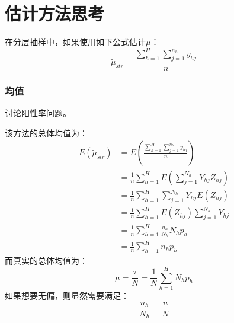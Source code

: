 

\section{估计方法思考}
在分层抽样中，如果使用如下公式估计$\mu$：
\begin{equation*}
	\tilde{\mu}_{str}=\frac{\sum\limits_{h=1}^H\sum\limits_{j=1}^{n_h}y_{hj}}{n}
\end{equation*}
\subsubsection{均值}
讨论阳性率问题。\par
该方法的总体均值为：
\begin{align*}
	E(\tilde{\mu}_{str})
	&=E\left(\frac{\sum\limits_{h=1}^H\sum\limits_{j=1}^{n_h}y_{hj}}{n}\right) \\
	&=\frac{1}{n}\sum_{h=1}^HE\left(\sum_{j=1}^{N_h}Y_{hj}Z_{hj}\right) \\
	&=\frac{1}{n}\sum_{h=1}^H\sum_{j=1}^{N_h}Y_{hj}E(Z_{hj}) \\
	&=\frac{1}{n}\sum_{h=1}^HE(Z_{hj})\sum_{j=1}^{N_h}Y_{hj} \\
	&=\frac{1}{n}\sum_{h=1}^H\frac{n_h}{N_h}N_hp_h \\
	&=\frac{1}{n}\sum_{h=1}^Hn_hp_h
\end{align*}
而真实的总体均值为：
\begin{equation*}
	\mu=\frac{\tau}{N}=\frac{1}{N}\sum_{h=1}^HN_hp_h
\end{equation*}
如果想要无偏，则显然需要满足：
\begin{equation*}
	\frac{n_h}{N_h}=\frac{n}{N}
\end{equation*}








